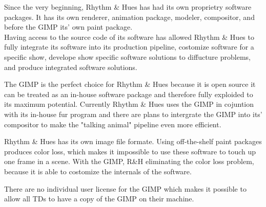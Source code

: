 Since the very beginning, Rhythm \& Hues has had its own proprietry software packages. It has its own renderer, animation package, modeler, compositor, and before the GIMP its' own paint package.\\ 

Having access to the source code of its software has allowed Rhythm \& Hues to fully integrate its software into its production pipeline, costomize software for a specific show, develope show specific software solutions to diffucture problems, and produce integrated software solutions.

The GIMP is the perfect choice for Rhythm \& Hues because it is open source it can be treated as an in-house software package and therefore fully exploided to its maximum potential. Currently Rhythm \& Hues uses the GIMP in cojuntion with its in-house fur program and there are plans to intergrate the GIMP into its' compositor to make the "talking animal" pipeline even more efficient.

Rhythm \& Hues has its own image file formate. Using off-the-shelf paint packages produces color loss, which makes it impossible to use these software to touch up one frame in a scene. With the GIMP, R\&H eliminating the color loss problem, because it is able to costomize the internals of the software. 

There are no individual user license for the GIMP which makes it possible to allow all TDs to have a copy of the GIMP on their machine. 


 
